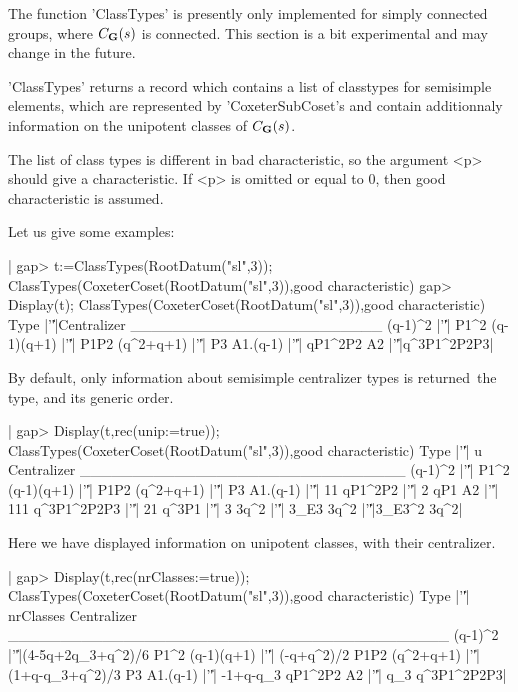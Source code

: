 The   function  'ClassTypes'  is  presently  only  implemented  for  simply
connected  groups, where  $C_{\bf G}(s)$ is  connected. This  section is  a bit
experimental and may change in the future.

'ClassTypes'  returns  a  record  which  contains  a list of classtypes for
semisimple  elements,  which  are  represented  by  'CoxeterSubCoset's  and
contain additionnaly information on the unipotent classes of $C_{\bf G}(s)$.

The list of class types is different in bad characteristic, so the argument
<p>  should give a characteristic.  If <p> is omitted  or equal to 0, then
good characteristic is assumed.

Let us give some examples:

|    gap> t:=ClassTypes(RootDatum("sl",3));
    ClassTypes(CoxeterCoset(RootDatum("sl",3)),good characteristic)
    gap> Display(t);                
    ClassTypes(CoxeterCoset(RootDatum("sl",3)),good characteristic)
          Type |'\|'|Centralizer
    ________________________
    (q-1)^2    |'\|'|       P1^2
    (q-1)(q+1) |'\|'|       P1P2
    (q^2+q+1)  |'\|'|         P3
    A1.(q-1)   |'\|'|    qP1^2P2
    A2         |'\|'|q^3P1^2P2P3|

By   default,  only  information  about  semisimple  centralizer  types  is
returned\:\ the type, and its generic order.

|    gap> Display(t,rec(unip:=true));      
    ClassTypes(CoxeterCoset(RootDatum("sl",3)),good characteristic)
          Type |'\|'|     u Centralizer
    _______________________________
    (q-1)^2    |'\|'|              P1^2
    (q-1)(q+1) |'\|'|              P1P2
    (q^2+q+1)  |'\|'|                P3
    A1.(q-1)   |'\|'|    11     qP1^2P2
               |'\|'|     2         qP1
    A2         |'\|'|   111 q^3P1^2P2P3
               |'\|'|    21       q^3P1
               |'\|'|     3        3q^2
               |'\|'|  3_E3        3q^2
               |'\|'|3_E3^2        3q^2|

Here  we  have  displayed  information  on  unipotent  classes,  with their
centralizer.

|    gap> Display(t,rec(nrClasses:=true));
    ClassTypes(CoxeterCoset(RootDatum("sl",3)),good characteristic)
          Type |'\|'|        nrClasses Centralizer
    __________________________________________
    (q-1)^2    |'\|'|(4-5q+2q_3+q^2)/6        P1^2
    (q-1)(q+1) |'\|'|       (-q+q^2)/2        P1P2
    (q^2+q+1)  |'\|'|  (1+q-q_3+q^2)/3          P3
    A1.(q-1)   |'\|'|         -1+q-q_3     qP1^2P2
    A2         |'\|'|              q_3 q^3P1^2P2P3|

